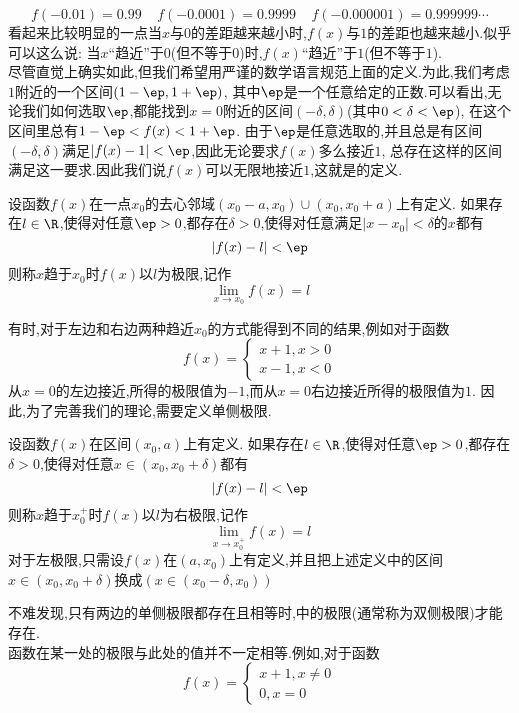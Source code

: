 \documentclass{ctexart}
\begin{document}
\[f(-0.01)=0.99\ \ \ \ \ f(-0.0001)=0.9999\ \ \ \ \ f(-0.000001)=0.999999\cdots\]
看起来比较明显的一点当$x$与$0$的差距越来越小时,$f(x)$与$1$的差距也越来越小.似乎可以这么说:%
当$x$“趋近”于$0$(但不等于$0$)时,$f(x)$“趋近”于$1$(但不等于$1$).\\
\indent 尽管直觉上确实如此,但我们希望用严谨的数学语言规范上面的定义.为此,我们考虑$1$附近的一个区间$\left(1-\ep,1+\ep\right)$,%
其中$\ep$是一个任意给定的正数.可以看出,无论我们如何选取$\ep$,都能找到$x=0$附近的区间$\left(-\delta,\delta\right)$(其中$0<\delta<\ep$),%
在这个区间里总有$1-\ep<f(x)<1+\ep$.%
由于$\ep$是任意选取的,并且总是有区间$\left(-\delta,\delta\right)$满足$\left|f(x)-1\right|<\ep$,因此无论要求$f(x)$多么接近$1$,%
总存在这样的区间满足这一要求.因此我们说$f(x)$可以无限地接近$1$,这就是的定义.
\begin{definition}[0A.2.1 函数极限]
    设函数$f(x)$在一点$x_0$的去心邻域$\left(x_0-a,x_0\right)\cup\left(x_0,x_0+a\right)$上有定义.%
    如果存在$l\in\R$,使得对任意$\ep>0$,都存在$\delta>0$,使得对任意满足$\left|x-x_0\right|<\delta$的$x$都有
    \[\left|f(x)-l\right|<\ep\]
    则称$x$趋于$x_0$时$f(x)$以$l$为极限,记作
    \[\lim_{x\to x_0}f(x)=l\]

\end{definition}
有时,对于左边和右边两种趋近$x_0$的方式能得到不同的结果,例如对于函数
\[f(x)=\left\{\begin{array}{l}
    x+1,x>0\\x-1,x<0
\end{array}\right.\]
从$x=0$的左边接近,所得的极限值为$-1$,而从$x=0$右边接近所得的极限值为$1$.%
因此,为了完善我们的理论,需要定义单侧极限.
\begin{definition}[0A.2.2 单侧极限]
    设函数$f(x)$在区间$\left(x_0,a\right)$上有定义.%
    如果存在$l\in\R$,使得对任意$\ep>0$,都存在$\delta>0$,使得对任意$x\in\left(x_0,x_0+\delta\right)$都有
    \[\left|f(x)-l\right|<\ep\]
    则称$x$趋于$x_0^+$时$f(x)$以$l$为右极限,记作
    \[\lim_{x\to x_0^+}f(x)=l\]
    对于左极限,只需设$f(x)$在$\left(a,x_0\right)$上有定义,并且把上述定义中的区间$x\in\left(x_0,x_0+\delta\right)$换成$\left(x\in\left(x_0-\delta,x_0\right)\right)$
\end{definition}
不难发现,只有两边的单侧极限都存在且相等时,中的极限(通常称为双侧极限)才能存在.\\
\indent 函数在某一处的极限与此处的值并不一定相等.例如,对于函数
\[f(x)=\left\{\begin{array}{l}
    x+1,x\neq0\\0,x=0
\end{array}\right.\]
\end{document}
